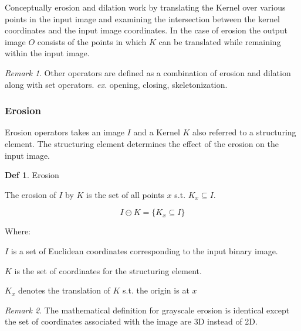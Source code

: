 \documentclass{article}
\theoremstyle{definition}
\newtheorem{df}{Def}
\theoremstyle{remark}
\newtheorem*{rem}{Remark}
\begin{document}
Conceptually erosion and dilation work by translating the Kernel over various points in the input image and examining the intersection between the kernel coordinates and the input image coordinates. In the case of erosion the output image $ O $ consists of the points in which $ K $ can be translated while remaining within the input image.

\begin{rem}
    Other operators are defined as a combination of erosion and dilation along with set operators. \textit{ex.} opening, closing, skeletonization.
\end{rem}

\subsubsection{Erosion}

Erosion operators takes an image $ I $ and a Kernel $ K $ also referred to a structuring element. The structuring element determines the effect of the erosion on the input image. 

\begin{df} Erosion

The erosion of $ I $ by $ K $ is the set of all points $ x $ s.t. $ K_x \subseteq I $.

\begin{equation}
I \ominus K = \{ K_x \subseteq I \}
\end{equation}

\noindent Where:  

$ I $ is a set of Euclidean coordinates corresponding to the input binary image. 

$ K $ is the set of coordinates for the structuring element. 

$ K_x $ denotes the translation of $ K $ s.t. the origin is at $ x $

\end{df}

\begin{rem}
The mathematical definition for grayscale erosion is identical except the set of coordinates associated with the image are 3D instead of 2D. 
\end{rem}
\end{document}
